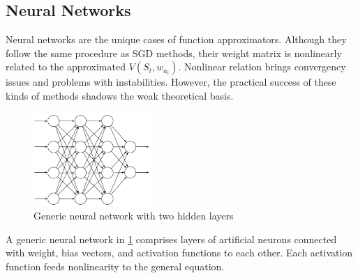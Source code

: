 \subsection{Neural Networks}
Neural networks are the unique cases of function approximators. Although they follow the same procedure as SGD methods, their weight matrix is nonlinearly related to the approximated \(V(S_t,w_{a_t})\). Nonlinear relation brings convergency issues and problems with instabilities. However, the practical success of these kinds of methods shadows the weak theoretical basis.

\begin{figure}[htbp]
    \centering
    \includegraphics[width=0.4\textwidth]{figures/nn}
    \caption{Generic neural network with two hidden layers}
    \label{fig:nn}
\end{figure}

A generic neural network in \ref{fig:nn} comprises layers of artificial neurons connected with weight, bias vectors, and activation functions to each other. Each activation function feeds nonlinearity to the general equation. 

 

 
